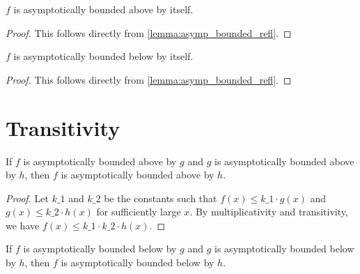 \begin{lemma}
    \label{lemma:asymp_bounded_above_refl}
    \leanok
    $f$ is asymptotically bounded above by itself.
\end{lemma}

\begin{proof}
    \leanok
    This follows directly from \ref{lemma:asymp_bounded_refl}.
\end{proof}

\begin{lemma}
    \label{lemma:asymp_bounded_below_refl}
    \leanok
    $f$ is asymptotically bounded below by itself.
\end{lemma}

\begin{proof}
    \leanok
    This follows directly from \ref{lemma:asymp_bounded_refl}.
\end{proof}


\section{Transitivity}

\begin{lemma}
    \label{lemma:asymp_bounded_above_trans}
    \leanok
    If $f$ is asymptotically bounded above by $g$ and $g$ is asymptotically bounded above
    by $h$, then $f$ is asymptotically bounded above by $h$.
\end{lemma}

\begin{proof}
    \leanok
    Let $k\_1$ and $k\_2$ be the constants such that $f(x) \le k\_1 \cdot g(x)$ and
    $g(x) \le k\_2 \cdot h(x)$ for sufficiently large $x$. By multiplicativity and 
    transitivity, we have $f(x) \le k\_1 \cdot k\_2 \cdot h(x)$.
\end{proof}

\begin{lemma}
    \label{lemma:asymp_bounded_below_trans}
    \leanok
    If $f$ is asymptotically bounded below by $g$ and $g$ is asymptotically bounded below
    by $h$, then $f$ is asymptotically bounded below by $h$.
\end{lemma}

